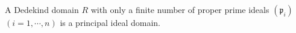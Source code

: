 A Dedekind domain $R$ with only a finite number of proper prime ideals $(\mathfrak{p}_i)$ $(i = 1, \cdots, n)$ is a principal ideal domain.
